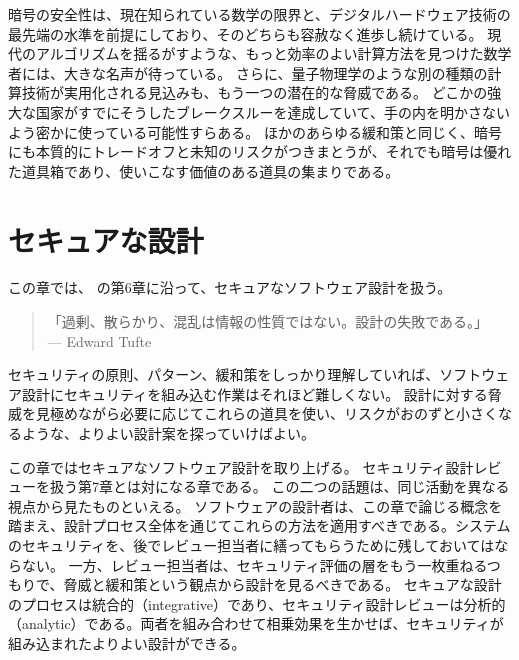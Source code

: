 \documentclass[uplatex]{jsarticle}
\def\label#1{}%
\begin{document}
\begin{rem}[暗号の安全性の前提]\label{rem:ch5-crypto-limits}
暗号の安全性は、現在知られている数学の限界と、デジタルハードウェア技術の最先端の水準を前提にしており、そのどちらも容赦なく進歩し続けている。
現代のアルゴリズムを揺るがすような、もっと効率のよい計算方法を見つけた数学者には、大きな名声が待っている。
さらに、量子物理学のような別の種類の計算技術が実用化される見込みも、もう一つの潜在的な脅威である。
どこかの強大な国家がすでにそうしたブレークスルーを達成していて、手の内を明かさないよう密かに使っている可能性すらある。
ほかのあらゆる緩和策と同じく、暗号にも本質的にトレードオフと未知のリスクがつきまとうが、それでも暗号は優れた道具箱であり、使いこなす価値のある道具の集まりである。
\end{rem}

\newpage

\section{セキュアな設計}

この章では、\cite{Kohnfelder2021} の第6章に沿って、セキュアなソフトウェア設計を扱う。

\begin{quote}
「過剰、散らかり、混乱は情報の性質ではない。設計の失敗である。」\\
\hfill --- Edward Tufte
\end{quote}

セキュリティの原則、パターン、緩和策をしっかり理解していれば、ソフトウェア設計にセキュリティを組み込む作業はそれほど難しくない。
設計に対する脅威を見極めながら必要に応じてこれらの道具を使い、リスクがおのずと小さくなるような、よりよい設計案を探っていけばよい。

この章ではセキュアなソフトウェア設計を取り上げる。
セキュリティ設計レビューを扱う第7章とは対になる章である。
この二つの話題は、同じ活動を異なる視点から見たものといえる。
ソフトウェアの設計者は、この章で論じる概念を踏まえ、設計プロセス全体を通じてこれらの方法を適用すべきである。システムのセキュリティを、後でレビュー担当者に繕ってもらうために残しておいてはならない。
一方、レビュー担当者は、セキュリティ評価の層をもう一枚重ねるつもりで、脅威と緩和策という観点から設計を見るべきである。
セキュアな設計のプロセスは統合的（integrative）であり、セキュリティ設計レビューは分析的（analytic）である。両者を組み合わせて相乗効果を生かせば、セキュリティが組み込まれたよりよい設計ができる。
\end{document}
